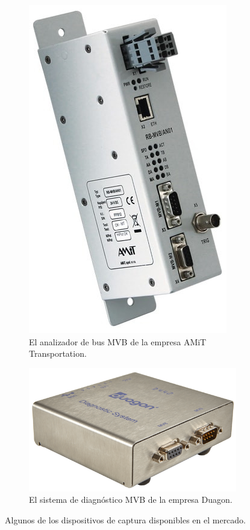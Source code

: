 \begin{figure}[htbp]
\begin{subfigure}[b]{0.45\textwidth}
        \includegraphics[height=17\baselineskip]{./Figures/amit.jpg}
        \caption[AMiT Transportation -- WTB and MVB Analyzers]{El analizador de bus MVB de la empresa AMiT Transportation.}
        \label{fig:amit}
    \end{subfigure}
    \hfill
    \begin{subfigure}[b]{0.6\textwidth}
        \centering
        \includegraphics[width=1\textwidth]{./Figures/duagon.png}
        \caption[Duagon -- D442 MVB Diagnostic System]{El sistema de diagnóstico MVB de la empresa Duagon.}
        \label{fig:duagon}
    \end{subfigure}
    \caption{Algunos de los dispositivos de captura disponibles en el mercado.}
\end{figure}

